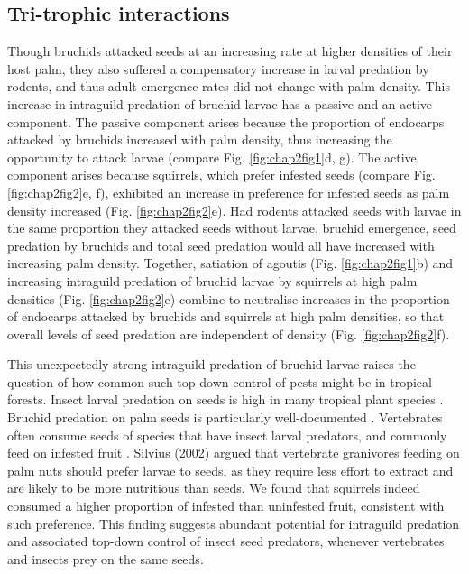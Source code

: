 \documentclass[b5paper,justified]{tufte-book} %
\begin{document}
\begin{fullwidth}
\subsection{Tri-trophic interactions}
Though bruchids attacked seeds at an increasing rate at higher densities of their host palm, they also suffered a compensatory increase in larval predation by rodents, and thus adult emergence rates did not change with palm density. This increase in intraguild predation of bruchid larvae has a passive and an active component. The passive
component arises because the proportion of endocarps attacked by bruchids increased with palm density, thus increasing the opportunity to attack larvae (compare Fig. \ref{fig:chap2fig1}d, g). The active component arises because squirrels, which prefer infested seeds (compare Fig. \ref{fig:chap2fig2}e, f), exhibited an increase in preference for infested seeds as palm density increased (Fig. \ref{fig:chap2fig2}e). Had rodents attacked seeds with larvae in the same proportion they attacked seeds without larvae, bruchid emergence, seed predation by bruchids and total seed predation would all have increased with increasing palm density. Together, satiation of agoutis (Fig. \ref{fig:chap2fig1}b) and increasing intraguild predation of bruchid larvae by squirrels at high palm densities (Fig. \ref{fig:chap2fig2}e) combine to neutralise increases in the proportion of endocarps attacked by bruchids and squirrels at high palm densities, so that overall levels of seed predation are independent of density (Fig. \ref{fig:chap2fig2}f).

This unexpectedly strong intraguild predation of bruchid larvae raises the question of how common such top-down control of pests \citep[\textit{sensu}][]{Gillett1962} might be in tropical forests. Insect larval predation
on seeds is high in many tropical plant species \citep[e.g.][]{Herrera1989}. Bruchid predation on palm seeds is particularly well-documented \citep[e.g.][]{Delobel1995}. Vertebrates often consume seeds of species that have insect larval predators, and commonly feed on infested fruit \citep{Silvius2002, Galvez2007}. Silvius (2002) argued that
vertebrate granivores feeding on palm nuts should prefer larvae to seeds, as they require less effort to extract and are likely to be more nutritious than seeds. We found that squirrels indeed consumed a higher proportion of infested than uninfested fruit, consistent with such preference. This finding suggests abundant potential for intraguild predation and associated top-down control of insect seed predators, whenever vertebrates and insects prey on the same seeds.



\end{fullwidth}
\end{document}

